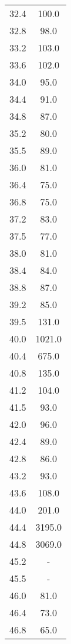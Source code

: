 \begin{longtable}{S[table-format=3.1] S[table-format=3.0]}
                32.4 & 100.0\\
                32.8 & 98.0\\
                33.2 & 103.0\\
                33.6 & 102.0\\
                34.0 & 95.0\\
                34.4 & 91.0\\
                34.8 & 87.0\\
                35.2 & 80.0\\
                35.5 & 89.0\\
                36.0 & 81.0\\
                36.4 & 75.0\\
                36.8 & 75.0\\
                37.2 & 83.0\\
                37.5 & 77.0\\
                38.0 & 81.0\\
                38.4 & 84.0\\
                38.8 & 87.0\\
                39.2 & 85.0\\
                39.5 & 131.0\\
                40.0 & 1021.0\\
                40.4 & 675.0\\
                40.8 & 135.0\\
                41.2 & 104.0\\
                41.5 & 93.0\\
                42.0 & 96.0\\
                42.4 & 89.0\\
                42.8 & 86.0\\
                43.2 & 93.0\\
                43.6 & 108.0\\
                44.0 & 201.0\\
                44.4 & 3195.0\\
                44.8 & 3069.0\\
                45.2 & {-}\\
                45.5 & {-}\\
                46.0 & 81.0\\
                46.4 & 73.0\\
                46.8 & 65.0\\

\end{longtable}
